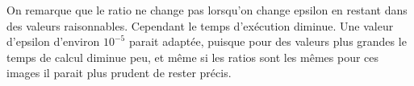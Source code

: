 		On remarque que le ratio ne change pas lorsqu'on change epsilon en restant dans des valeurs raisonnables. Cependant le temps d'exécution diminue. Une valeur d'epsilon d'environ $10^{-5}$ parait adaptée, puisque pour des valeurs plus grandes le temps de calcul diminue peu, et même si les ratios sont les mêmes pour ces images il parait plus prudent de rester précis.

